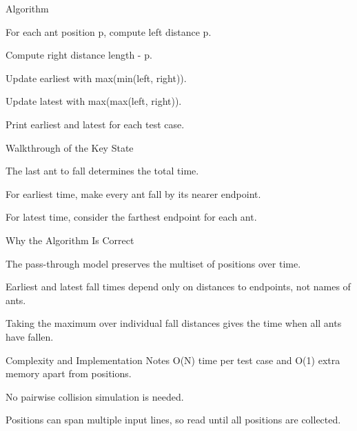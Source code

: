 \documentclass[aspectratio=169,11pt]{beamer}
\begin{document}
\begin{frame}{Algorithm}
\begin{tightitemize}
  \item For each ant position p, compute left distance p.
  \item Compute right distance length - p.
  \item Update earliest with max(min(left, right)).
  \item Update latest with max(max(left, right)).
  \item Print earliest and latest for each test case.
\end{tightitemize}
\end{frame}

\begin{frame}{Walkthrough of the Key State}
\begin{tightitemize}
  \item The last ant to fall determines the total time.
  \item For earliest time, make every ant fall by its nearer endpoint.
  \item For latest time, consider the farthest endpoint for each ant.
\end{tightitemize}
\end{frame}

\begin{frame}{Why the Algorithm Is Correct}
\begin{tightitemize}
  \item The pass-through model preserves the multiset of positions over time.
  \item Earliest and latest fall times depend only on distances to endpoints, not names of ants.
  \item Taking the maximum over individual fall distances gives the time when all ants have fallen.
\end{tightitemize}
\end{frame}

\begin{frame}{Complexity and Implementation Notes}
\small
{} O(N) time per test case and O(1) extra memory apart from positions.

\vspace{0.3cm}
\begin{tightitemize}
  \item No pairwise collision simulation is needed.
  \item Positions can span multiple input lines, so read until all positions are collected.
\end{tightitemize}
\end{frame}
\end{document}
